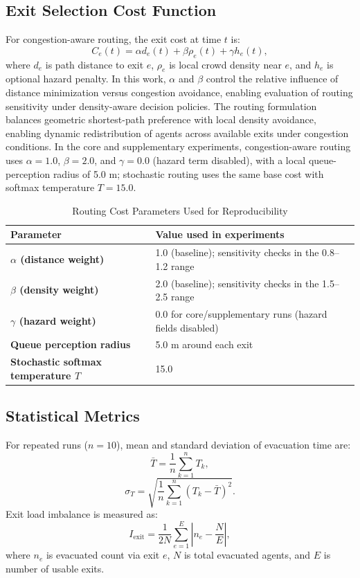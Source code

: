 \documentclass[nolineno]{ieeeaccess}
\begin{document}
\subsection{Exit Selection Cost Function}
For congestion-aware routing, the exit cost at time $t$ is:
\begin{equation}
    C_e(t)=\alpha d_e(t)+\beta \rho_e(t)+\gamma h_e(t),
    \label{eq:cost}
\end{equation}
where $d_e$ is path distance to exit $e$, $\rho_e$ is local crowd density near $e$, and $h_e$ is optional hazard penalty. In this work, $\alpha$ and $\beta$ control the relative influence of distance minimization versus congestion avoidance, enabling evaluation of routing sensitivity under density-aware decision policies. The routing formulation balances geometric shortest-path preference with local density avoidance, enabling dynamic redistribution of agents across available exits under congestion conditions. In the core and supplementary experiments, congestion-aware routing uses $\alpha=1.0$, $\beta=2.0$, and $\gamma=0.0$ (hazard term disabled), with a local queue-perception radius of 5.0 m; stochastic routing uses the same base cost with softmax temperature $T=15.0$.

\begin{table}[t]
\centering
\caption{Routing Cost Parameters Used for Reproducibility}
\label{tab:routing_params}
{\footnotesize
\setlength{\tabcolsep}{3pt}
\begin{tabular}{>{\bfseries}p{2.0cm} p{4.8cm}}
\toprule
Parameter & Value used in experiments \\
\midrule
$\alpha$ (distance weight) & 1.0 (baseline); sensitivity checks in the 0.8--1.2 range \\
$\beta$ (density weight) & 2.0 (baseline); sensitivity checks in the 1.5--2.5 range \\
$\gamma$ (hazard weight) & 0.0 for core/supplementary runs (hazard fields disabled) \\
Queue perception radius & 5.0 m around each exit \\
Stochastic softmax temperature $T$ & 15.0 \\
\bottomrule
\end{tabular}
}
\end{table}

\subsection{Statistical Metrics}
For repeated runs ($n=10$), mean and standard deviation of evacuation time are:
\begin{equation}
    \bar{T}=\frac{1}{n}\sum_{k=1}^{n}T_k,
\end{equation}
\begin{equation}
    \sigma_T=\sqrt{\frac{1}{n}\sum_{k=1}^{n}(T_k-\bar{T})^2}.
\end{equation}
Exit load imbalance is measured as:
\begin{equation}
    I_{\mathrm{exit}}=\frac{1}{2N}\sum_{e=1}^{E}\left|n_e-\frac{N}{E}\right|,
\end{equation}
where $n_e$ is evacuated count via exit $e$, $N$ is total evacuated agents, and $E$ is number of usable exits.
\end{document}
